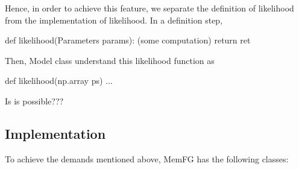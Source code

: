 Hence, in order to achieve this feature, we separate the definition of likelihood from the implementation of likelihood. In a definition step,


\begin{DoxyCode}
def likelihood(Parameters params):
    (some computation)
    return ret
\end{DoxyCode}


Then, Model class understand this likelihood function as


\begin{DoxyCode}
def likelihood(np.array ps)
    ...
\end{DoxyCode}


Is is possible???

\subsection*{Implementation}

To achieve the demands mentioned above, Mem\+FG has the following classes\+:


